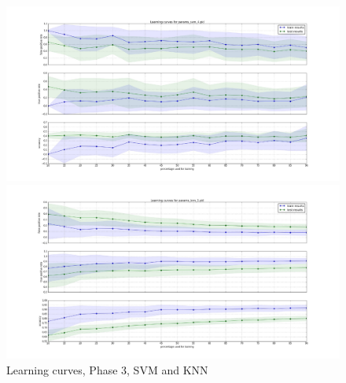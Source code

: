 \documentclass[10pt, conference, compsocconf]{IEEEtran}
\begin{document}
\begin{figure}[h]
\vskip 0.2in
\begin{center}
\centerline{\includegraphics[width=\columnwidth, scale=1]{./Figures/Lc_Ds3_P50-50_SVM}}
\centerline{\includegraphics[width=\columnwidth, scale=1]{./Figures/Lc_Ds3_P50-50_kNN}}
\caption{Learning curves, Phase 3, SVM and KNN}
\label{learning curves}
\end{center}
\vskip -0.2in
\end{figure} 
\end{document}
